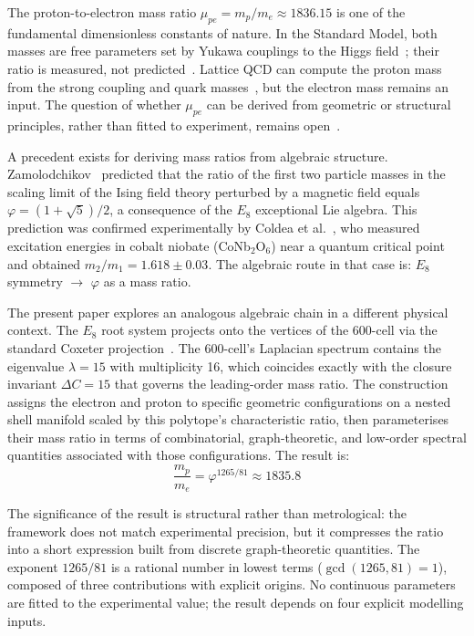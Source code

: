 \documentclass[12pt]{article}
\newcommand{\phig}{\varphi}
\begin{document}
The proton-to-electron mass ratio $\mu_{pe} = m_p/m_e \approx 1836.15$ is one of the fundamental dimensionless constants of nature. In the Standard Model, both masses are free parameters set by Yukawa couplings to the Higgs field~\citep{Weinberg1967, Higgs1964}; their ratio is measured, not predicted~\citep{Workman2022}. Lattice QCD can compute the proton mass from the strong coupling and quark masses~\citep{Durr2008}, but the electron mass remains an input. The question of whether $\mu_{pe}$ can be derived from geometric or structural principles, rather than fitted to experiment, remains open~\citep{Uzan2003}.

A precedent exists for deriving mass ratios from algebraic structure. Zamolodchikov~\citep{Zamolodchikov1989} predicted that the ratio of the first two particle masses in the scaling limit of the Ising field theory perturbed by a magnetic field equals $\phig = (1+\sqrt{5})/2$, a consequence of the $E_8$ exceptional Lie algebra. This prediction was confirmed experimentally by Coldea et al.~\citep{Coldea2010}, who measured excitation energies in cobalt niobate (CoNb$_2$O$_6$) near a quantum critical point and obtained $m_2/m_1 = 1.618 \pm 0.03$. The algebraic route in that case is: $E_8$ symmetry $\to$ $\phig$ as a mass ratio.

The present paper explores an analogous algebraic chain in a different physical context. The $E_8$ root system projects onto the vertices of the 600-cell via the standard Coxeter projection~\citep{Coxeter1973}. The 600-cell's Laplacian spectrum contains the eigenvalue $\lambda = 15$ with multiplicity 16, which coincides exactly with the closure invariant $\Delta C = 15$ that governs the leading-order mass ratio. The construction assigns the electron and proton to specific geometric configurations on a nested shell manifold scaled by this polytope's characteristic ratio, then parameterises their mass ratio in terms of combinatorial, graph-theoretic, and low-order spectral quantities associated with those configurations. The result is:
\begin{equation}\label{eq:main}
    \frac{m_p}{m_e} = \phig^{1265/81} \approx 1835.8
\end{equation}

The significance of the result is structural rather than metrological: the framework does not match experimental precision, but it compresses the ratio into a short expression built from discrete graph-theoretic quantities. The exponent $1265/81$ is a rational number in lowest terms ($\gcd(1265, 81) = 1$), composed of three contributions with explicit origins. No continuous parameters are fitted to the experimental value; the result depends on four explicit modelling inputs.
\end{document}
